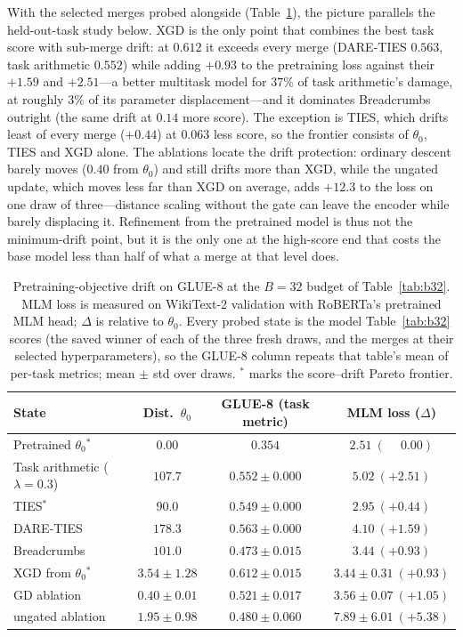 \documentclass{article} %
\newcommand{\thetab}{\theta_0}
\begin{document}
With the selected merges probed alongside (Table~\ref{tab:drift}), the picture parallels the held-out-task study below. XGD is the only point that combines the best task score with sub-merge drift: at $0.612$ it exceeds every merge (DARE-TIES $0.563$, task arithmetic $0.552$) while adding $+0.93$ to the pretraining loss against their $+1.59$ and $+2.51$---a better multitask model for $37\%$ of task arithmetic's damage, at roughly $3\%$ of its parameter displacement---and it dominates Breadcrumbs outright (the same drift at $0.14$ more score). The exception is TIES, which drifts least of every merge ($+0.44$) at $0.063$ less score, so the frontier consists of $\thetab$, TIES and XGD alone. The ablations locate the drift protection: ordinary descent barely moves ($0.40$ from $\thetab$) and still drifts more than XGD, while the ungated update, which moves less far than XGD on average, adds $+12.3$ to the loss on one draw of three---distance scaling without the gate can leave the encoder while barely displacing it. Refinement from the pretrained model is thus not the minimum-drift point, but it is the only one at the high-score end that costs the base model less than half of what a merge at that level does.

\begin{table}[t]
\centering
\small
\caption{Pretraining-objective drift on GLUE-8 at the $B{=}32$ budget of Table~\ref{tab:b32}. MLM loss is measured on WikiText-2 validation with RoBERTa's pretrained MLM head; $\Delta$ is relative to $\thetab$. Every probed state is the model Table~\ref{tab:b32} scores (the saved winner of each of the three fresh draws, and the merges at their selected hyperparameters), so the GLUE-8 column repeats that table's mean of per-task metrics; mean $\pm$ std over draws. $^\ast$ marks the score--drift Pareto frontier.}
\label{tab:drift}
\begin{tabular}{lccc}
\toprule
State & Dist.\ $\thetab$ & GLUE-8 (task metric) & MLM loss ($\Delta$) \\
\midrule
Pretrained $\thetab$$^\ast$              & $0.00$   & $0.354$        & $2.51\ (\phantom{+}0.00)$ \\
\midrule
Task arithmetic ($\lambda{=}0.3$)        & $107.7$  & $0.552\pm0.000$ & $5.02\ (+2.51)$ \\
TIES$^\ast$                              & $90.0$   & $0.549\pm0.000$ & $\mathbf{2.95}\ (+0.44)$ \\
DARE-TIES                                & $178.3$  & $0.563\pm0.000$ & $4.10\ (+1.59)$ \\
Breadcrumbs                              & $101.0$  & $0.473\pm0.015$ & $3.44\ (+0.93)$ \\
\midrule
XGD from $\thetab$$^\ast$                & $3.54\pm1.28$ & $\mathbf{0.612}\pm0.015$ & $3.44\pm0.31\ (+0.93)$ \\
\quad GD ablation                        & $0.40\pm0.01$ & $0.521\pm0.017$ & $3.56\pm0.07\ (+1.05)$ \\
\quad ungated ablation                   & $1.95\pm0.98$ & $0.480\pm0.060$ & $7.89\pm6.01\ (+5.38)$ \\
\bottomrule
\end{tabular}
\end{table}
\end{document}
